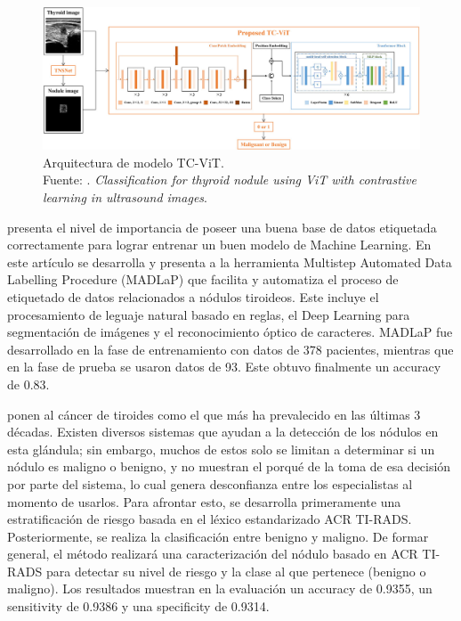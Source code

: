\begin{figure}[H]
	\begin{center}
		\includegraphics[width=1.00\textwidth]{2/figures/antecedente_5.jpg}
		\caption[Arquitectura de modelo TC-ViT]{Arquitectura de modelo TC-ViT. \\
		Fuente: \cite{pr_sun2023classthynvit}. \textit{Classification for thyroid nodule using ViT with contrastive learning in ultrasound images}.}
		\label{2:fig102}
	\end{center}
\end{figure}


\cite{pr_zhang2023madlap} presenta el nivel de importancia de poseer una buena base de datos etiquetada correctamente para lograr entrenar un buen modelo de Machine Learning. En este artículo se desarrolla y presenta a la herramienta Multistep Automated Data Labelling Procedure (MADLaP) que facilita y automatiza el proceso de etiquetado de datos relacionados a nódulos tiroideos. Este incluye el procesamiento de leguaje natural basado en reglas, el Deep Learning para segmentación de imágenes y el reconocimiento óptico de caracteres. MADLaP fue desarrollado en la fase de entrenamiento con datos de 378 pacientes, mientras que en la fase de prueba se usaron datos de 93. Este obtuvo finalmente un accuracy de 0.83.

\cite{pr_deng2022autclass} ponen al cáncer de tiroides como el que más ha prevalecido en las últimas 3 décadas. Existen diversos sistemas que ayudan a la detección de los nódulos en esta glándula; sin embargo, muchos de estos solo se limitan a determinar si un nódulo es maligno o benigno, y no muestran el porqué de la toma de esa decisión por parte del sistema, lo cual genera desconfianza entre los especialistas al momento de usarlos. Para afrontar esto, se desarrolla primeramente una estratificación de riesgo basada en el léxico estandarizado ACR TI-RADS. Posteriormente, se realiza la clasificación entre benigno y maligno. De formar general, el método realizará una caracterización del nódulo basado en ACR TI-RADS para detectar su nivel de riesgo y la clase al que pertenece (benigno o maligno). Los resultados muestran en la evaluación un accuracy de 0.9355, un sensitivity de 0.9386 y una specificity de 0.9314. 

